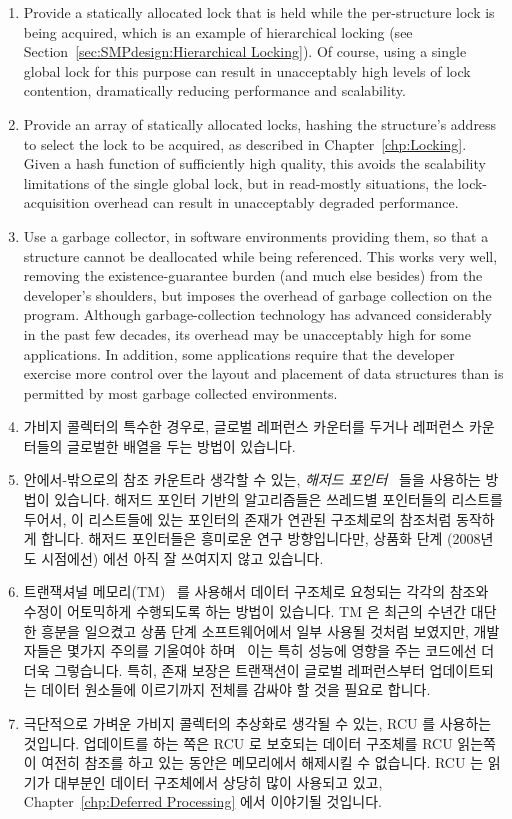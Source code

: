 \begin{enumerate}
\begin{enumerate}
	\item	Provide a statically allocated lock that is held while
		the per-structure lock is being acquired, which is an
		example of hierarchical locking (see
		Section~\ref{sec:SMPdesign:Hierarchical Locking}).
		Of course, using a single global lock for this purpose
		can result in unacceptably high levels of lock contention,
		dramatically reducing performance and scalability.
	\item	Provide an array of statically allocated locks, hashing
		the structure's address to select the lock to be acquired,
		as described in Chapter~\ref{chp:Locking}.
		Given a hash function of sufficiently high quality, this
		avoids the scalability limitations of the single global
		lock, but in read-mostly situations, the lock-acquisition
		overhead can result in unacceptably degraded performance.
	\item	Use a garbage collector, in software environments providing
		them, so that a structure cannot be deallocated while being
		referenced.
		This works very well, removing the existence-guarantee
		burden (and much else besides) from the developer's
		shoulders, but imposes the overhead of garbage collection
		on the program.
		Although garbage-collection technology has advanced
		considerably in the past few decades, its overhead
		may be unacceptably high for some applications.
		In addition, some applications require that the developer
		exercise more control over the layout and placement of
		data structures than is permitted by most garbage collected
		environments.
	\fi
	\item	가비지 콜렉터의 특수한 경우로, 글로벌 레퍼런스 카운터를 두거나
		레퍼런스 카운터들의 글로벌한 배열을 두는 방법이 있습니다.
	\item	안에서-밖으로의 참조 카운트라 생각할 수 있는, \emph{해저드
		포인터}~\cite{MagedMichael04a} 들을 사용하는 방법이 있습니다.
		해저드 포인터 기반의 알고리즘들은 쓰레드별 포인터들의 리스트를
		두어서, 이 리스트들에 있는 포인터의 존재가 연관된 구조체로의
		참조처럼 동작하게 합니다.
		해저드 포인터들은 흥미로운 연구 방향입니다만, 상품화 단계
		(2008년도 시점에선) 에선 아직 잘 쓰여지지 않고 있습니다.
	\item	트랜잭셔널
		메모리(TM)~\cite{Herlihy93a,DBLomet1977SIGSOFT,Shavit95} 를
		사용해서 데이터 구조체로 요청되는 각각의 참조와 수정이
		어토믹하게 수행되도록 하는 방법이 있습니다.
		TM 은 최근의 수년간 대단한 흥분을 일으켰고 상품 단계
		소프트웨어에서 일부 사용될 것처럼 보였지만, 개발자들은 몇가지
		주의를 기울여야
		하며~\cite{Blundell2005DebunkTM,Blundell2006TMdeadlock,McKenney2007PLOSTM}
		이는 특히 성능에 영향을 주는 코드에선 더더욱 그렇습니다.
		특히, 존재 보장은 트랜잭션이 글로벌 레퍼런스부터 업데이트되는
		데이터 원소들에 이르기까지 전체를 감싸야 할 것을 필요로 합니다.
	\item	극단적으로 가벼운 가비지 콜렉터의 추상화로 생각될 수 있는, RCU
		를 사용하는 것입니다.
		업데이트를 하는 쪽은 RCU 로 보호되는 데이터 구조체를 RCU
		읽는쪽이 여전히 참조를 하고 있는 동안은 메모리에서 해제시킬 수
		없습니다.
		RCU 는 읽기가 대부분인 데이터 구조체에서 상당히 많이 사용되고
		있고, Chapter~\ref{chp:Deferred Processing} 에서 이야기될
		것입니다.
	\iffalse


\end{enumerate}
\end{enumerate}
